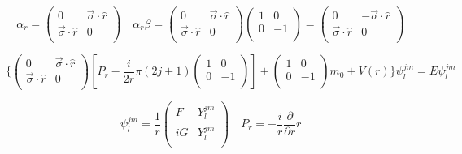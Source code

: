 \documentclass{report}
\begin{document}
\[\alpha _r = \left ( \begin{array}{cc}
 0 & \overrightarrow{\sigma} \cdot \hat{r}   \\
 \overrightarrow{\sigma} \cdot \hat{r} & 0   \\
 \end{array} \right)  \quad \alpha _r \beta = \left ( \begin{array}{cc}
 0 & \overrightarrow{\sigma} \cdot \hat{r}   \\
 \overrightarrow{\sigma} \cdot \hat{r} & 0   \\
 \end{array} \right) \left ( \begin{array}{cc}
 1 & 0   \\
 0 & -1   \\
 \end{array} \right) = \left ( \begin{array}{cc}
 0 & -\overrightarrow{\sigma} \cdot \hat{r}   \\
 \overrightarrow{\sigma} \cdot \hat{r} & 0   \\
 \end{array} \right)  \]

\[\lbrace \left ( \begin{array}{cc}
 0 & \overrightarrow{\sigma} \cdot \hat{r}   \\
 \overrightarrow{\sigma} \cdot \hat{r} & 0   \\
 \end{array} \right) [P_r - \frac{i}{2r} \pi (2j+1) \left ( \begin{array}{cc}
 1 & 0   \\
 0 & -1   \\
 \end{array} \right)] + \left ( \begin{array}{cc}
 1 & 0   \\
 0 & -1   \\
 \end{array} \right) m_0 + V(r) \rbrace \psi^{jm}_{l} = E \psi _{l}^{jm} \]

\[\psi _{l}^{jm} = \frac{1}{r} \left ( \begin{array}{cc}
 F & Y_{l}^{jm}   \\
 iG & Y_{l}^{jm}   \\
 \end{array} \right) \quad P_r = -\frac{i}{r} \frac{\partial}{\partial r} r\]
\end{document}
